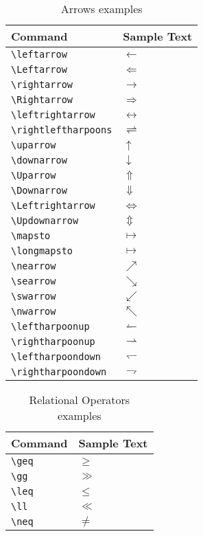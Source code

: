 \documentclass[a4paper,12pt,titlepage]{article}
\begin{document}
\begin{table}[H]
\center
	\begin{tabular}{l|l}
	\hline
	\textbf{Command} & \textbf{Sample Text} \\
	\hline
	\hline
	
	\verb|\leftarrow| & $\leftarrow$ \\
	\verb|\Leftarrow| & $\Leftarrow$ \\
	\verb|\rightarrow| & $\rightarrow$ \\
	\verb|\Rightarrow| & $\Rightarrow$ \\
	\verb|\leftrightarrow| & $\leftrightarrow$  \\
	\verb|\rightleftharpoons| &  $\rightleftharpoons$\\
	\verb|\uparrow| &  $\uparrow$\\
	\verb|\downarrow| & $\downarrow$\\
	\verb|\Uparrow| &  $\Uparrow$\\
	\verb|\Downarrow| & $\Downarrow$\\
	\verb|\Leftrightarrow| & $\Leftrightarrow$\\
	\verb|\Updownarrow| & $\Updownarrow$\\
	\verb|\mapsto| & $\mapsto$\\
	\verb|\longmapsto| & $\longmapsto$\\
	\verb|\nearrow| & $\nearrow$\\
	\verb|\searrow | & $\searrow$  \\
	\verb|\swarrow | & $\swarrow$  \\
	\verb|\nwarrow | & $\nwarrow$  \\
	\verb|\leftharpoonup | & $\leftharpoonup$  \\
	\verb|\rightharpoonup | & $\rightharpoonup$  \\
	\verb|\leftharpoondown | & $\leftharpoondown$  \\
	\verb|\rightharpoondown | & $\rightharpoondown$  \\
	
	\end{tabular}
	\caption{Arrows examples}
\end{table}




\begin{table}[H]
\center
	\begin{tabular}{l|l}
	\hline
	\textbf{Command} & \textbf{Sample Text} \\
	\hline
	\hline
	
	\verb|\geq| & $\geq$ \\
	\verb|\gg| & $\gg$ \\
	\verb|\leq| & $\leq$ \\
	\verb|\ll| & $\ll$ \\
	\verb|\neq| & $\neq$  \\
	
	\end{tabular}
	\caption{Relational Operators examples}
\end{table}
\end{document}

